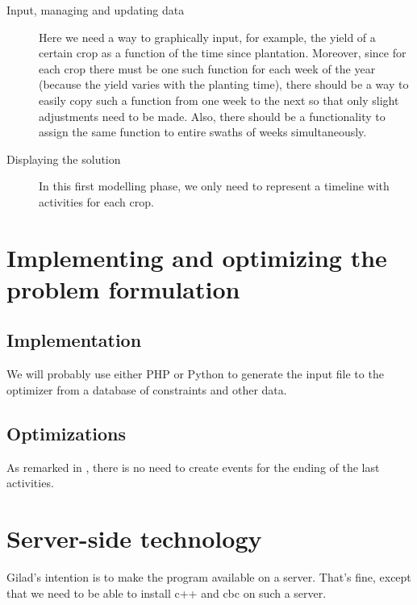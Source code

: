 \documentclass[11pt,reqno]{amsart}
\numberwithin{equation}{section}
\begin{document}
\begin{description}
\item[Input, managing and updating data] Here we need a way to graphically input, for
  example, the yield of a certain crop as a function of the time since
  plantation. Moreover, since for each crop there must be one such function for each week
  of the year (because the yield varies with the planting time), there should be a way to
  easily copy such a function from one week to the next so that only slight adjustments
  need to be made. Also, there should be a functionality to assign the same function to
  entire swaths of weeks simultaneously. 

\item[Displaying the solution] In this first modelling phase, we only need to represent a
  timeline with activities for each crop. 
\end{description}


\section{Implementing and optimizing the problem formulation}

\subsection{Implementation}

We will probably use either PHP or Python to generate the input file to the optimizer from
a database of constraints and other data.

\subsection{Optimizations}
As remarked in \cite{artigues-etal11}, there is no need to create
events for the ending of the last activities. 

\section{Server-side technology}

Gilad's intention is to make the program available on a server. That's
fine, except that we need to be able to install c++ and cbc on such a server.



\end{document}
